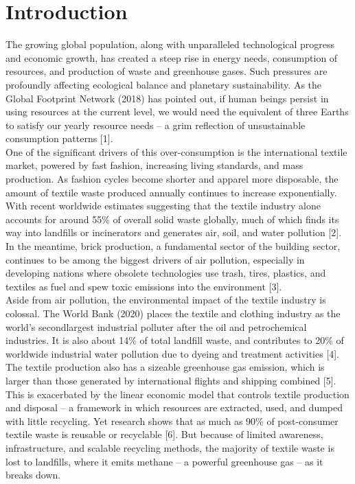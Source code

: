 \chapter{Introduction}

The growing global population, along with unparalleled technological progress and economic growth, has created a steep rise in energy needs, consumption of resources, and production of waste and greenhouse gases. Such pressures are profoundly affecting ecological balance and planetary sustainability. As the Global Footprint Network (2018) has pointed out, if human beings persist in using resources at the current level, we would need the equivalent of three Earths to satisfy our yearly resource needs -- a grim reflection of unsustainable consumption patterns [1].\\

\noindent One of the significant drivers of this over-consumption is the international textile market, powered by fast fashion, increasing living standards, and mass production. As fashion cycles become shorter and apparel more disposable, the amount of textile waste produced annually continues to increase exponentially. With recent worldwide estimates suggesting that the textile industry alone accounts for around 55\% of overall solid waste globally, much of which finds its way into landfills or incinerators and generates air, soil, and water pollution [2]. In the meantime, brick production, a fundamental sector of the building sector, continues to be among the biggest drivers of air pollution, especially in developing nations where obsolete technologies use trash, tires, plastics, and textiles as fuel and spew toxic emissions into the environment [3].\\

\noindent Aside from air pollution, the environmental impact of the textile industry is colossal. The World Bank (2020) places the textile and clothing industry as the world's secondlargest industrial polluter after the oil and petrochemical industries. It is also about 14\% of total landfill waste, and contributes to 20\% of worldwide industrial water pollution due to dyeing and treatment activities [4]. The textile production also has a sizeable greenhouse gas emission, which is larger than those generated by international flights and shipping combined [5]. \\

\noindent This is exacerbated by the linear economic model that controls textile production and disposal -- a framework in which resources are extracted, used, and dumped with little recycling. Yet research shows that as much as 90\% of post-consumer textile waste is reusable or recyclable [6]. But because of limited awareness, infrastructure, and scalable recycling methods, the majority of textile waste is lost to landfills, where it emits methane -- a powerful greenhouse gas -- as it breaks down.\\

